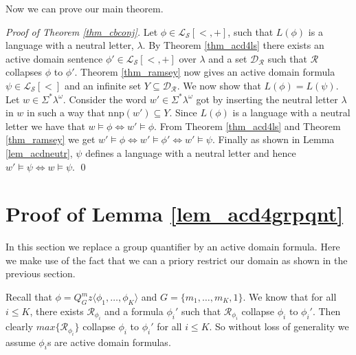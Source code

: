 \documentclass[envcountsame]{llncs}
\newcommand{\mon}[2]{Q_{#1}^{#2}}
\newcommand{\nnp}{\mathrm{nnp}}
\begin{document}
Now we can prove our main theorem.


\begin{proof}[Proof of Theorem \ref{thm_cbconj}]
Let $\phi \in \mathcal{L_S}[<,+]$, such that $L(\phi)$ is a language with a neutral letter, $\lambda$. By Theorem \ref{thm_acd4ls} there exists an active domain sentence $\phi' \in \mathcal{L_S}[<,+]$ over $\lambda$ and a set $\mathcal{D}_\mathcal{R}$ such that $\mathcal{R}$ collapses 
$\phi$ to $\phi'$. Theorem \ref{thm_ramsey} now gives an active domain formula $\psi \in \mathcal{L_S}[<]$ and an infinite set $Y \subseteq \mathcal{D}_\mathcal{R}$. 
We now show that $L(\phi)=L(\psi)$.
Let $w \in \Sigma^*\lambda^{\omega}$. Consider the word $w' \in \Sigma^*\lambda^{\omega}$ got by inserting the neutral letter $\lambda$ in $w$ in such a way 
that $\nnp(w') \subseteq Y$. Since $L(\phi)$ is a language with a neutral letter we have that $w \models \phi \Leftrightarrow w' \vDash \phi$. From Theorem \ref{thm_acd4ls} and 
Theorem \ref{thm_ramsey} we get
$w' \vDash \phi \Leftrightarrow w' \vDash \phi' \Leftrightarrow w' \vDash \psi$.
Finally as shown in Lemma \ref{lem_acdneutr}, $\psi$ defines a language with a neutral letter and hence $w' \models \psi \Leftrightarrow
w \models \psi$. 
\qed \end{proof}



\bigskip
\section{Proof of Lemma \ref{lem_acd4grpqnt}} \label{sec_lemmaProof}
In this section we replace a group quantifier by an active domain formula. Here we make use of the fact that we can a priory restrict our domain as shown in the previous section.

Recall that $\phi = \mon{G}{m} z \langle \phi_1,\dots,\phi_K \rangle$ and $G=\{m_1,\dots, m_K,1\}$. 
We know that for all $i \leq K$, there exists $\mathcal{R}_{\phi_i}$ and a formula $\phi_i'$ such that $\mathcal{R}_{\phi_i}$ collapse $\phi_i$ to $\phi_i'$. 
Then clearly $max \{ \mathcal{R}_{\phi_i} \}$ collapse $\phi_i$ to $\phi_i'$ for all $i\leq K$.
So without loss of generality we assume $\phi_i$s are active domain formulas. 
\end{document}

